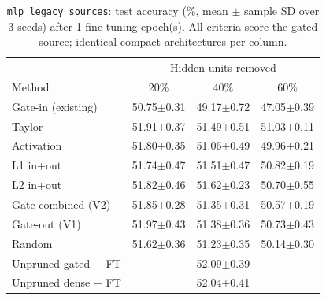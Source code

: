 \begin{table}[t]
\centering
\caption{\texttt{mlp\_legacy\_sources}: test accuracy (\%, mean $\pm$ sample SD over 3 seeds) after 1 fine-tuning epoch(s). All criteria score the gated source; identical compact architectures per column.}
\label{tab:mlp_legacy_sources_main}
\footnotesize
\setlength{\tabcolsep}{2.5pt}
\begin{tabular}{lccc}
\toprule
 & \multicolumn{3}{c}{Hidden units removed} \\
Method & 20\% & 40\% & 60\% \\
\midrule
Gate-in (existing) & 50.75$\pm$0.31 & 49.17$\pm$0.72 & 47.05$\pm$0.39 \\
Taylor & 51.91$\pm$0.37 & 51.49$\pm$0.51 & 51.03$\pm$0.11 \\
Activation & 51.80$\pm$0.35 & 51.06$\pm$0.49 & 49.96$\pm$0.21 \\
L1 in+out & 51.74$\pm$0.47 & 51.51$\pm$0.47 & 50.82$\pm$0.19 \\
L2 in+out & 51.82$\pm$0.46 & 51.62$\pm$0.23 & 50.70$\pm$0.55 \\
Gate-combined (V2) & 51.85$\pm$0.28 & 51.35$\pm$0.31 & 50.57$\pm$0.19 \\
Gate-out (V1) & 51.97$\pm$0.43 & 51.38$\pm$0.36 & 50.73$\pm$0.43 \\
Random & 51.62$\pm$0.36 & 51.23$\pm$0.35 & 50.14$\pm$0.30 \\
\midrule
Unpruned gated + FT & \multicolumn{3}{c}{52.09$\pm$0.39} \\
Unpruned dense + FT & \multicolumn{3}{c}{52.04$\pm$0.41} \\
\bottomrule
\end{tabular}
\end{table}